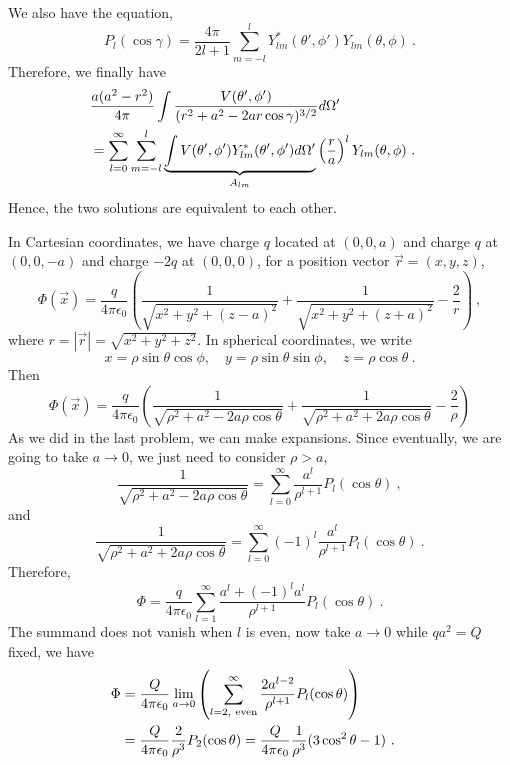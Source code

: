 \documentclass[12pt]{article}
\begin{document}
We also have the equation,
\begin{equation}
    P_l(\cos \gamma) = \frac{4\pi}{2l + 1} \sum_{m = -l}^l Y^*_{lm}(\theta', \phi') Y_{lm}(\theta, \phi)~.
\end{equation}
Therefore, we finally have
\begin{align}
    &\frac{a(a^2 - r^2)}{4\pi} \int \frac{V(\theta', \phi')}{(r^2 + a^2 - 2ar \cos\gamma)^{3/2}} d \Omega' \cr
    &= \sum_{l = 0}^\infty \sum_{m = -l}^l \underbrace{\int V(\theta', \phi') Y^*_{lm}(\theta', \phi') d \Omega'}_{A_{lm}}  \left(\frac{r}{a}\right)^l   Y_{lm}(\theta, \phi)~.
\end{align}
Hence, the two solutions are equivalent to each other.


\newpage
{} In Cartesian coordinates, we have charge $q$ located at $( 0,0,a)$ and charge $q$ at $(0,0,-a)$ and charge $-2q$ at $(0,0,0)$, for a position vector $\vec r = (x,y,z)$,
\begin{equation}
    \Phi(\vec x) = \frac{q}{4\pi \epsilon_0} \left(\frac{1}{\sqrt{x^2 + y^2 + (z-a)^2} } + \frac{1}{\sqrt{x^2 + y^2 + (z+a)^2}} - \frac{2}{r}\right)~,
\end{equation}
where $r = |\vec r| = \sqrt{x^2 + y^2 + z^2}$. In spherical coordinates, we write
\begin{equation}
    x = \rho \sin \theta \cos \phi, \quad y = \rho \sin \theta \sin \phi, \quad z = \rho \cos \theta~.
\end{equation}
Then
\begin{equation}\label{eqn:potential}
    \Phi(\vec x) = \frac{q}{4\pi \epsilon_0} \left(\frac{1}{\sqrt{\rho^2 + a^2 - 2 a \rho \cos \theta} } + \frac{1}{\sqrt{\rho^2 + a^2 + 2a \rho \cos \theta}} - \frac{2}{\rho}\right)
\end{equation}
As we did in the last problem, we can make expansions. Since eventually, we are going to take $a \to 0$, we just need to consider $\rho > a$,
\begin{equation}
    \frac{1}{\sqrt{\rho^2 + a^2 - 2a\rho \cos \theta}} = \sum_{l = 0}^\infty \frac{a^l}{\rho^{l+1}} P_l(\cos \theta)~,
\end{equation}
and
\begin{equation}
    \frac{1}{\sqrt{\rho^2 + a^2 + 2a\rho \cos \theta}} = \sum_{l = 0}^\infty (-1)^l \frac{a^l}{\rho^{l+1}} P_l(\cos \theta)~.
\end{equation}
Therefore,
\begin{equation}
    \Phi = \frac{q}{4\pi \epsilon_0} \sum_{l = 1}^\infty \frac{a^l + (-1)^l a^l}{\rho^{l+1}} P_l(\cos \theta)~.
\end{equation}
The summand does not vanish when $l$ is even, now take $a \to 0$ while $q a^2 = Q$ fixed, we have
\begin{align}
    \Phi &= \frac{Q}{4\pi \epsilon_0} \lim_{a\to 0} \left(\sum_{l = 2, ~{\rm even}}^\infty \frac{2 a^{l-2}}{\rho^{l+1}} P_l(\cos \theta)\right)\cr
    &= \frac{Q}{4\pi \epsilon_0} \frac{2}{\rho^3} P_2(\cos \theta) = \frac{Q}{4\pi \epsilon_0} \frac{1}{\rho^3} (3 \cos^2 \theta - 1)~.
\end{align}
\end{document}
